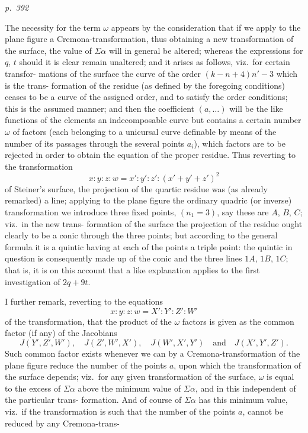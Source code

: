 \documentclass[11pt,a4paper]{article}
\theoremstyle{plain}
\theoremstyle{definition}
\begin{document}
\clearpage

\bigskip
\textit{p.~392}
\smallskip

\noindent
The necessity for the term $\omega$ appears by the consideration that if we apply to
the plane figure a Cremona-transformation, thus obtaining a new transformation of
the surface, the value of $\Sigma\alpha$ will in general be altered; whereas the expressions for $q$, $t$
should it is clear remain unaltered; and it arises as follows, viz.\ for certain transfor-
mations of the surface the curve of the order $(k - n + 4)n' - 3$ which is the trans-
formation of the residue (as defined by the foregoing conditions) ceases to be a curve
of the assigned order, and to satisfy the order conditions; this is the assumed
manner; and then the coefficient $(a, \ldots)$ will be the like functions of the elements
an indecomposable curve but contains a certain number $\omega$ of factors (each belonging
to a unicursal curve definable by means of the number of its passages through the
several points $a_i$), which factors are to be rejected in order to obtain the equation of
the proper residue.  Thus reverting to the transformation
\[
x : y : z : w = x' : y' : z' : (x' + y' + z')^2
\]
of Steiner's surface, the projection of the quartic residue was (as already remarked) a
line; applying to the plane figure the ordinary quadric (or inverse) transformation we
introduce three fixed points, $(n_1 = 3)$, say these are $A$, $B$, $C$; viz.\ in the new trans-
formation of the surface the projection of the residue ought clearly to be a
conic through the three points; but according to the general formula it is a quintic
having at each of the points a triple point: the quintic in question is consequently
made up of the conic and the three lines $1A$, $1B$, $1C$; that is, it is on this account
that a like explanation applies to the first investigation of $2q + 9t$.

I further remark, reverting to the equations
\[
x : y : z : w = X' : Y' : Z' : W'
\]
of the transformation, that the product of the $\omega$ factors is given as the common factor
(if any) of the Jacobians
\[
J(Y', Z', W'), \quad J(Z', W', X'), \quad J(W', X', Y') \quad \text{and} \quad J(X', Y', Z').
\]
Such common factor exists whenever we can by a Cremona-transformation of the plane
figure reduce the number of the points $a$, upon which the transformation of the
surface depends; viz.\ for any given transformation of the surface, $\omega$ is equal to the
excess of $\Sigma\alpha$ above the minimum value of $\Sigma\alpha$, and in this independent of the particular trans-
formation. And of course of $\Sigma\alpha$ has this minimum value, viz.\ if the transformation
is such that the number of the points $a$, cannot be reduced by any Cremona-trans-
\end{document}
